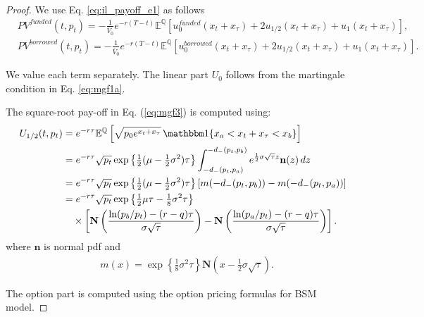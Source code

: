 \documentclass[pdftex,11pt,a4paper] {article}
\begin{document}
\begin{proof}

We use Eq. \eqref{eq:il_payoff_e1} as follows
\begin{equation} \label{eq:bs3}
\begin{split}
& PV^{funded}(t, p_{t}) = - \frac{1}{\bar{V}_{0}}e^{-r(T-t)}\mathbb{E}^{\mathbb{Q}}\left[u^{funded}_{0}(x_{t}+x_{\tau}) + 2u_{1/2}(x_{t}+x_{\tau}) + u_{1}(x_{t}+x_{\tau})\right],\\
& PV^{borrowed}(t, p_{t})= - \frac{1}{\bar{V}_{0}}e^{-r(T-t)}\mathbb{E}^{\mathbb{Q}}\left[u^{borrowed}_{0}(x_{t}+x_{\tau}) + 2u_{1/2}(x_{t}+x_{\tau}) + u_{1}(x_{t}+x_{\tau})\right].
\end{split}
\end{equation}

We value each term separately. The linear part $U_{0}$ follows from the martingale condition in Eq. \eqref{eq:mgf1a}.


The square-root pay-off in Eq. (\ref{eq:mgf3}) is computed using:
\begin{equation} \label{eq:bs5}
\begin{split}
U_{1/2}(t,p_t)
&=e^{-r\tau}\mathbb E^{\mathbb Q}\left[
\sqrt{p_0e^{x_t+x_\tau}}\,
\mathbbm 1\{x_a<x_t+x_\tau<x_b\}\right]\\
&=e^{-r\tau}\sqrt{p_t}\exp\left\{\tfrac12(\mu-\tfrac12\sigma^2)\tau\right\}
\int_{-d_-(p_t,p_a)}^{-d_-(p_t,p_b)}
e^{\frac12\sigma\sqrt\tau z}\mathbf n(z)\,dz\\
&=e^{-r\tau}\sqrt{p_t}\exp\left\{\tfrac12(\mu-\tfrac12\sigma^2)\tau\right\}
\left[m(-d_-(p_t,p_b))-m(-d_-(p_t,p_a))\right]\\
&=e^{-r\tau}\sqrt{p_t}\exp\left\{\tfrac12\mu\tau-\tfrac18\sigma^2\tau\right\}\\
&\quad\times\left[\mathbf N\left(\frac{\ln(p_b/p_t)-(r-q)\tau}{\sigma\sqrt\tau}\right)
-\mathbf N\left(\frac{\ln(p_a/p_t)-(r-q)\tau}{\sigma\sqrt\tau}\right)\right].
\end{split}
\end{equation}
where $\mathbf{n}$ is normal pdf and
\begin{equation}\label {eq:bs6}
\begin{split}
& m(x) = \exp\left\{\frac{1}{8}\sigma^{2} \tau \right\} \mathbf{N} (x-\frac{1}{2}\sigma \sqrt{\tau} ).
\end{split}
\end{equation}

The option part is computed using the option pricing formulas for BSM model.

\end{proof}
\end{document}
